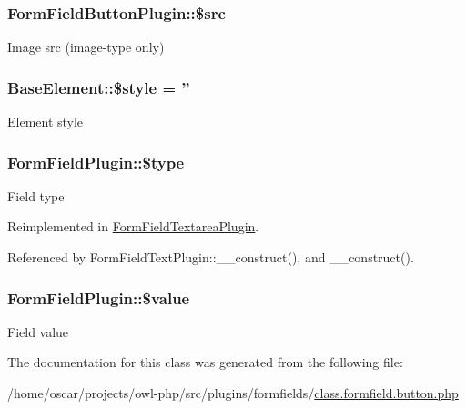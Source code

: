 \subsubsection[{\$src}]{\setlength{\rightskip}{0pt plus 5cm}FormFieldButtonPlugin::\$src}\label{classFormFieldButtonPlugin_a33519a89924287c0b7628a006438cac2}
Image src (image-\/type only) 
\subsubsection[{\$style}]{\setlength{\rightskip}{0pt plus 5cm}BaseElement::\$style = ''}\label{classBaseElement_a429a3d642dd95f30e1059ef29564b87d}
Element style 
\subsubsection[{\$type}]{\setlength{\rightskip}{0pt plus 5cm}FormFieldPlugin::\$type}\label{classFormFieldPlugin_acf8210731f7b8dcee47d777975bc91ca}
Field type 

Reimplemented in \hyperlink{classFormFieldTextareaPlugin_af23729f44357a182a2b25a2689fca464}{FormFieldTextareaPlugin}.



Referenced by FormFieldTextPlugin::\_\-\_\-construct(), and \_\-\_\-construct().

\subsubsection[{\$value}]{\setlength{\rightskip}{0pt plus 5cm}FormFieldPlugin::\$value}\label{classFormFieldPlugin_abbe128149202f43e8fcac8184018048c}
Field value 

The documentation for this class was generated from the following file:\begin{DoxyCompactItemize}
\item 
/home/oscar/projects/owl-\/php/src/plugins/formfields/\hyperlink{class_8formfield_8button_8php}{class.formfield.button.php}\end{DoxyCompactItemize}
